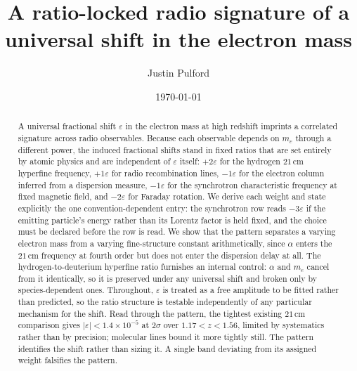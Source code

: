 \documentclass[aps,prd,twocolumn,superscriptaddress,nofootinbib,10pt]{revtex4-2}
\begin{document}
\title{A ratio-locked radio signature of a universal shift in the electron mass}

\author{Justin Pulford}

\date{\today}

\begin{abstract}
A universal fractional shift $\varepsilon$ in the electron mass at high redshift imprints a
correlated signature across radio observables. Because each observable depends on $m_e$ through a
different power, the induced fractional shifts stand in fixed ratios that are set entirely by
atomic physics and are independent of $\varepsilon$ itself: $+2\varepsilon$ for the hydrogen
$21\,$cm hyperfine frequency, $+1\varepsilon$ for radio recombination lines, $-1\varepsilon$ for
the electron column inferred from a dispersion measure, $-1\varepsilon$ for the synchrotron
characteristic frequency at fixed magnetic field, and $-2\varepsilon$ for Faraday rotation. We
derive each weight and state explicitly the one convention-dependent entry: the synchrotron row
reads $-3\varepsilon$ if the emitting particle's energy rather than its Lorentz factor is held
fixed, and the choice must be declared before the row is read. We show that the pattern separates a
varying electron mass from a varying fine-structure constant arithmetically, since $\alpha$ enters
the $21\,$cm frequency at fourth order but does not enter the dispersion delay at all. The
hydrogen-to-deuterium hyperfine ratio furnishes an internal control: $\alpha$ and $m_e$ cancel from
it identically, so it is preserved under any universal shift and broken only by species-dependent
ones. Throughout, $\varepsilon$ is treated as a free amplitude to be fitted rather than predicted,
so the ratio structure is testable independently of any particular mechanism for the shift. Read
through the pattern, the tightest existing $21\,$cm comparison gives
$|\varepsilon| < 1.4 \times 10^{-5}$ at $2\sigma$ over $1.17 < z < 1.56$, limited by systematics
rather than by precision; molecular lines bound it more tightly still. The pattern identifies the
shift rather than sizing it. A single band deviating from its assigned weight falsifies the
pattern.
\end{abstract}

\maketitle

\end{document}
